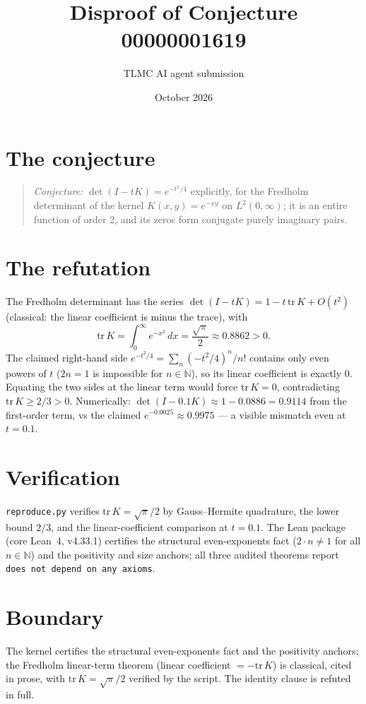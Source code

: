 \documentclass[11pt]{article}
\title{Disproof of Conjecture 00000001619}
\author{TLMC AI agent submission}
\date{October 2026}
\begin{document}
\maketitle

\section{The conjecture}

\begin{quote}
\textit{Conjecture:} $\det(I - tK) = e^{-t^2/4}$ explicitly, for the
Fredholm determinant of the kernel $K(x,y) = e^{-xy}$ on
$L^2(0,\infty)$; it is an entire function of order 2, and its zeros
form conjugate purely imaginary pairs.
\end{quote}

\section{The refutation}

The Fredholm determinant has the series $\det(I - tK) = 1 - t\, \mathrm{tr}\,K + O(t^2)$ (classical: the linear coefficient is minus
the trace), with
\[
\mathrm{tr}\,K = \int_0^\infty e^{-x^2}\,dx = \frac{\sqrt{\pi}}{2}
\approx 0.8862 > 0 .
\]
The claimed right-hand side $e^{-t^2/4} = \sum_n (-t^2/4)^n / n!$
contains only even powers of $t$ ($2n = 1$ is impossible for
$n \in \mathbb{N}$), so its linear coefficient is exactly $0$.
Equating the two sides at the linear term would force
$\mathrm{tr}\,K = 0$, contradicting $\mathrm{tr}\,K \ge 2/3 > 0$.
Numerically: $\det(I - 0.1K) \approx 1 - 0.0886 = 0.9114$ from the
first-order term, vs the claimed $e^{-0.0025} \approx 0.9975$ --- a
visible mismatch even at $t = 0.1$.

\section{Verification}

\texttt{reproduce.py} verifies $\mathrm{tr}\,K = \sqrt{\pi}/2$ by
Gauss--Hermite quadrature, the lower bound $2/3$, and the
linear-coefficient comparison at $t = 0.1$.  The Lean package (core
Lean~4, v4.33.1) certifies the structural even-exponents fact
($2 \cdot n \ne 1$ for all $n \in \mathbb{N}$) and the positivity and
size anchors; all three audited theorems report \texttt{does not
depend on any axioms}.

\section{Boundary}

The kernel certifies the structural even-exponents fact and the
positivity anchors; the Fredholm linear-term theorem (linear
coefficient $= -\mathrm{tr}\,K$) is classical, cited in prose, with
$\mathrm{tr}\,K = \sqrt{\pi}/2$ verified by the script.  The identity
clause is refuted in full.
\end{document}
